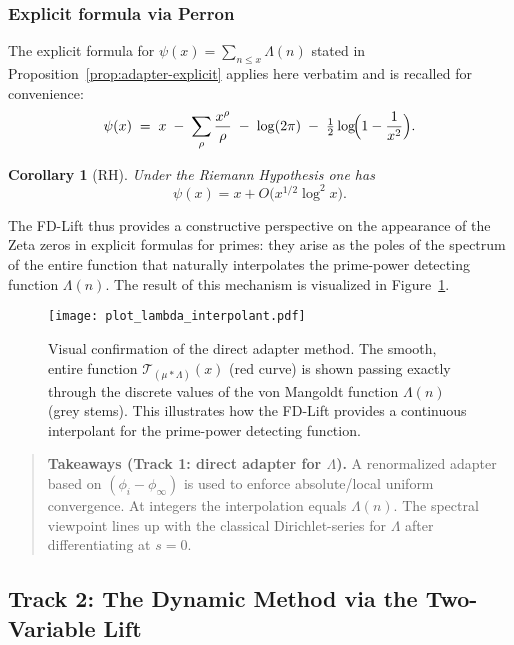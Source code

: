 \documentclass[11pt,a4paper]{amsart}
\theoremstyle{plain}
\newtheorem{corollary}[theorem]{Corollary}
\theoremstyle{definition}
\theoremstyle{remark}
\begin{document}
\subsubsection{Explicit formula via Perron}
The explicit formula for $\psi(x)=\sum_{n\le x}\Lambda(n)$ stated in Proposition~\ref{prop:adapter-explicit} applies here verbatim and is recalled for convenience:
\[
\psi(x)\;=\; x \;-\; \sum_{\rho}\frac{x^{\rho}}{\rho} \;-\; \log(2\pi) \;-\; \tfrac{1}{2}\log\!\Bigl(1-\frac{1}{x^{2}}\Bigr).
\]

\begin{corollary}[RH]
Under the Riemann Hypothesis one has
\[
\psi(x) = x + O\!\big(x^{1/2}\log^{2}x\big).
\]
\end{corollary}

The FD-Lift thus provides a constructive perspective on the appearance of the Zeta zeros in explicit formulas for primes: they arise as the poles of the spectrum of the entire function that naturally interpolates the prime-power detecting function $\Lambda(n)$. The result of this mechanism is visualized in Figure~\ref{fig:lambda_interpolant}.

\begin{figure}[!htbp]
\centering
\texttt{[image: plot\_lambda\_interpolant.pdf]}
\caption{Visual confirmation of the direct adapter method. The smooth, entire function $\mathcal{T}_{(\mu*\Lambda)}(x)$ (red curve) is shown passing exactly through the discrete values of the von Mangoldt function $\Lambda(n)$ (grey stems). This illustrates how the FD-Lift provides a continuous interpolant for the prime-power detecting function.}
\label{fig:lambda_interpolant}
\end{figure}

\FloatBarrier

\begin{quote}\small
\textbf{Takeaways (Track 1: direct adapter for $\Lambda$).}
A renormalized adapter based on $(\phi_i-\phi_\infty)$ is used to enforce absolute/local uniform convergence.
At integers the interpolation equals $\Lambda(n)$.
The spectral viewpoint lines up with the classical Dirichlet-series for $\Lambda$ after differentiating at $s=0$.
\end{quote}

\subsection{Track 2: The Dynamic Method via the Two-Variable Lift}\label{sec:dynamic-method}
\end{document}
